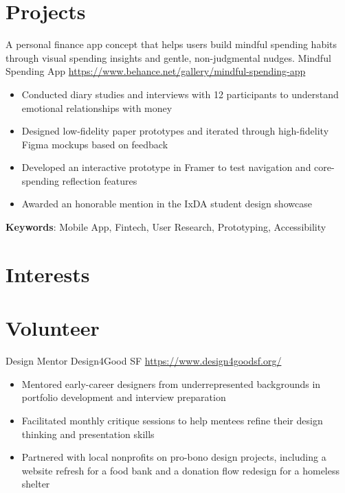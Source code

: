\documentclass[a4paper, serif, 10pt]{moderncv}
\begin{document}
\section{Projects}

        {A personal finance app concept that helps users build mindful spending habits through visual spending insights and gentle, non-judgmental nudges.}
        {Mindful Spending App}
        {\url{https://www.behance.net/gallery/mindful-spending-app}}
        {}
        {\begin{itemize}
\item Conducted diary studies and interviews with 12 participants to understand emotional relationships with money
\item Designed low-fidelity paper prototypes and iterated through high-fidelity Figma mockups based on feedback
\item Developed an interactive prototype in Framer to test navigation and core-spending reflection features
\item Awarded an honorable mention in the IxDA student design showcase
\end{itemize}
\textbf{Keywords}: Mobile App, Fintech, User Research, Prototyping, Accessibility}
\section{Interests}

\section{Volunteer}

        {Design Mentor}
        {Design4Good SF}
        {\url{https://www.design4goodsf.org/}}
        {}
        {\begin{itemize}
\item Mentored early-career designers from underrepresented backgrounds in portfolio development and interview preparation
\item Facilitated monthly critique sessions to help mentees refine their design thinking and presentation skills
\item Partnered with local nonprofits on pro-bono design projects, including a website refresh for a food bank and a donation flow redesign for a homeless shelter
\end{itemize}}
    
\end{document}
